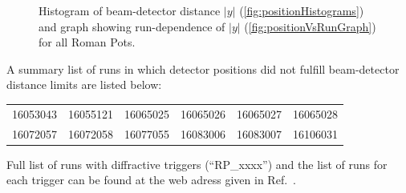 \begin{figure}[hb]
{\begin{subfigure}[b]{\linewidth}{
                }
  \end{subfigure}
}%
\caption[Beam-detector distance of the Roman Pots in run 15.]{Histogram of beam-detector distance $|y|$ (\ref{fig:positionHistograms}) and graph showing run-dependence of $|y|$ (\ref{fig:positionVsRunGraph}) for all Roman Pots.}\label{fig:rpPosition}
\end{figure}

A summary list of runs in which detector positions did not fulfill beam-detector distance limits are listed below:%
%
\begin{center}
\begin{tabular}{llllll}
16053043 & 16055121 & 16065025 & 16065026 & 16065027 & 16065028\\
16072057 & 16072058 & 16077055 & 16083006 & 16083007 & 16106031\\
\end{tabular}
\end{center}%
%
Full list of runs with diffractive triggers (``RP\_xxxx'') and the list of runs for each trigger can be found at the web adress given in Ref.~\cite{onlineRpTriggersMonitoring}.